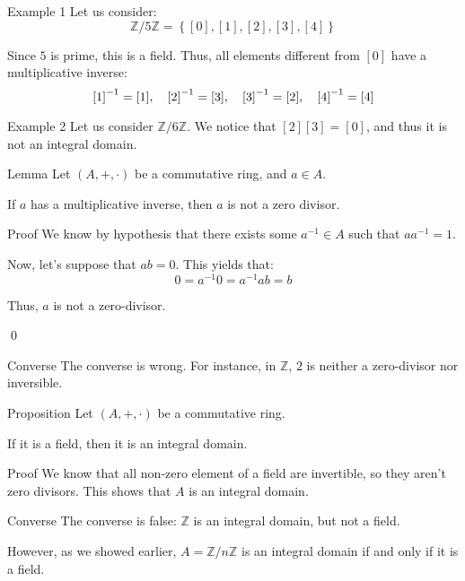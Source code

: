 \documentclass[a4paper]{article}
\begin{document}
\begin{parag}{Example 1}
    Let us consider: 
    \[\mathbb{Z}/5\mathbb{Z} = \left\{\left[0\right], \left[1\right], \left[2\right], \left[3\right], \left[4\right]\right\}\]
    
    Since $5$ is prime, this is a field. Thus, all elements different from $\left[0\right]$ have a multiplicative inverse: 
    \[\left[1\right]^{-1} = \left[1\right], \mathspace \left[2\right]^{-1} = \left[3\right], \mathspace \left[3\right]^{-1} = \left[2\right], \mathspace \left[4\right]^{-1} = \left[4\right]\]
\end{parag}

\begin{parag}{Example 2}
    Let us consider $\mathbb{Z}/6\mathbb{Z}$. We notice that $\left[2\right]\left[3\right] = \left[0\right]$, and thus it is not an integral domain.
\end{parag}

\begin{parag}{Lemma}
    Let $\left(A, +, \cdot \right)$ be a commutative ring, and $a \in A$.

    If $a$ has a multiplicative inverse, then $a$ is not a zero divisor.

    \begin{subparag}{Proof}
        We know by hypothesis that there exists some $a^{-1} \in A$ such that $aa^{-1} = 1$.

        Now, let's suppose that $ab = 0$. This yields that: 
        \[0 = a^{-1} 0 = a^{-1} ab = b\]
        
        Thus, $a$ is not a zero-divisor.

        \qed
    \end{subparag}

    \begin{subparag}{Converse}
        The converse is wrong. For instance, in $\mathbb{Z}$, $2$ is neither a zero-divisor nor inversible.
    \end{subparag}
\end{parag}


\begin{parag}{Proposition}
    Let $\left(A, +, \cdot \right)$ be a commutative ring.

    If it is a field, then it is an integral domain.

    \begin{subparag}{Proof}
        We know that all non-zero element of a field are invertible, so they aren't zero divisors. This shows that $A$ is an integral domain.
    \end{subparag}

    \begin{subparag}{Converse}
        The converse is false: $\mathbb{Z}$ is an integral domain, but not a field.

        However, as we showed earlier, $A = \mathbb{Z}/n\mathbb{Z}$ is an integral domain if and only if it is a field.
    \end{subparag}
\end{parag}
\end{document}
